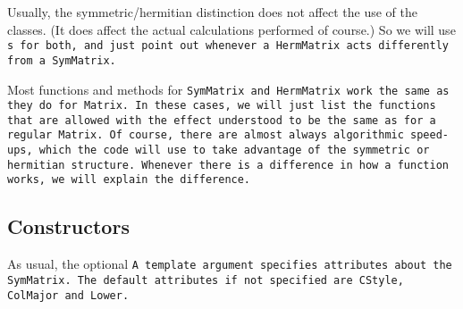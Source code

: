 Usually, the symmetric/hermitian distinction does not affect the use of the classes.
(It does affect the actual calculations performed of course.)  So we will use 
\tt{s} for both, and just point out whenever a \tt{HermMatrix} acts differently
from a \tt{SymMatrix}.

Most functions and methods for \tt{SymMatrix} and \tt{HermMatrix}
work the same as they do for \tt{Matrix}.
In these cases, we will just list the functions that are allowed with the
effect understood to be the same as for a regular \tt{Matrix}.  Of course, there are 
almost always algorithmic speed-ups, which the code will use to take advantage of the 
symmetric or hermitian structure.
Whenever there is a difference in how a function works,
we will explain the difference.


\subsection{Constructors}
\label{SymMatrix_Constructors}

As usual, the optional \tt{A} template argument specifies attributes about
the \tt{SymMatrix}.  The default attributes if not specified are
\tt{CStyle}, \tt{ColMajor} and \tt{Lower}.


